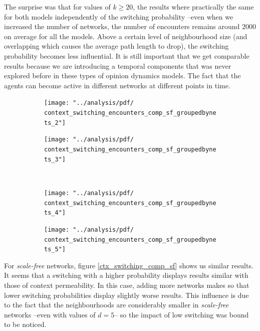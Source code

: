 \documentclass[preprint,number]{elsarticle}
\begin{document}
The surprise was that for values of $k \ge 20$, the results where practically the same for both models independently of the switching probability --even when we increased the number of networks, the number of encounters remains around $2000$ on average for all the models. Above a certain level of neighbourhood size (and overlapping which causes the average path length to drop), the switching probability becomes less influential. It is still important that we get comparable results because we are introducing a temporal components that was never explored before in these types of opinion dynamics models. The fact that the agents can become active in different networks at different points in time.


\begin{figure}[H]
	\centering
	\begin{subfigure}{.49\linewidth}
		\centering
		\texttt{[image: "../analysis/pdf/ context\_switching\_encounters\_comp\_sf\_groupedbynets\_2"]}
		\caption{}
		\label{fig:ctx_switching_comp_sf_2}
	\end{subfigure}%
	\begin{subfigure}{.5\linewidth}
		\centering
		\texttt{[image: "../analysis/pdf/ context\_switching\_encounters\_comp\_sf\_groupedbynets\_3"]}
		\caption{}
		\label{fig:ctx_switching_comp_sf_3}
	\end{subfigure}\\
	\begin{subfigure}{.49\linewidth}
		\centering
		\texttt{[image: "../analysis/pdf/ context\_switching\_encounters\_comp\_sf\_groupedbynets\_4"]}
		\caption{}
		\label{fig:ctx_switching_comp_sf_4}
	\end{subfigure}
	\begin{subfigure}{.5\linewidth}
		\centering
		\texttt{[image: "../analysis/pdf/ context\_switching\_encounters\_comp\_sf\_groupedbynets\_5"]}
		\caption{}
		\label{fig:ctx_switching_comp_sf_5}
	\end{subfigure}
	\begin{minipage}{0.9\textwidth}
		\vspace{0.2cm}
		\caption{}
		\label{fig:ctx_switching_comp_sf}
	\end{minipage}
\end{figure}

For \textit{scale-free} networks, figure \ref{ctx_switching_comp_sf} shows us similar results. It seems that a switching with a higher probability displays results similar with those of context permeability. In this case, adding more networks makes so that lower switching probabilities display slightly worse results. This influence is due to the fact that the neighbourhoods are considerably smaller in \textit{scale-free} networks --even with values of $d=5$-- so the impact of low switching was bound to be noticed.
\end{document}
